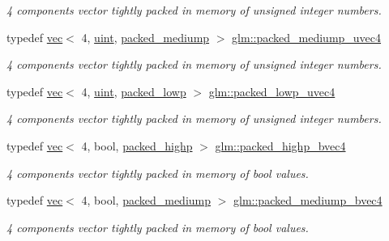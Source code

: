 \begin{DoxyCompactItemize}
\begin{DoxyCompactList}\small\item\em 4 components vector tightly packed in memory of unsigned integer numbers. \end{DoxyCompactList}\item 
typedef \mbox{\hyperlink{structglm_1_1vec}{vec}}$<$ 4, \mbox{\hyperlink{group__core__precision_ga4fd29415871152bfb5abd588334147c8}{uint}}, \mbox{\hyperlink{namespaceglm_a36ed105b07c7746804d7fdc7cc90ff25a9604654c3b137cd7898689fd34b25bc0}{packed\+\_\+mediump}} $>$ \mbox{\hyperlink{group__gtc__type__aligned_ga228b9899ea277eb8655d01c754e1ee64}{glm\+::packed\+\_\+mediump\+\_\+uvec4}}
\begin{DoxyCompactList}\small\item\em 4 components vector tightly packed in memory of unsigned integer numbers. \end{DoxyCompactList}\item 
typedef \mbox{\hyperlink{structglm_1_1vec}{vec}}$<$ 4, \mbox{\hyperlink{group__core__precision_ga4fd29415871152bfb5abd588334147c8}{uint}}, \mbox{\hyperlink{namespaceglm_a36ed105b07c7746804d7fdc7cc90ff25ac36a4bd74559be2c0b65bc48e5953b8b}{packed\+\_\+lowp}} $>$ \mbox{\hyperlink{group__gtc__type__aligned_gaddae01027a0dc8e3d953a3ca68b5a0cd}{glm\+::packed\+\_\+lowp\+\_\+uvec4}}
\begin{DoxyCompactList}\small\item\em 4 components vector tightly packed in memory of unsigned integer numbers. \end{DoxyCompactList}\item 
typedef \mbox{\hyperlink{structglm_1_1vec}{vec}}$<$ 4, bool, \mbox{\hyperlink{namespaceglm_a36ed105b07c7746804d7fdc7cc90ff25a8e8791ee77fe079b1291f710d88031bf}{packed\+\_\+highp}} $>$ \mbox{\hyperlink{group__gtc__type__aligned_gaa7a006e26052e668a16bf3b8bd81cbef}{glm\+::packed\+\_\+highp\+\_\+bvec4}}
\begin{DoxyCompactList}\small\item\em 4 components vector tightly packed in memory of bool values. \end{DoxyCompactList}\item 
typedef \mbox{\hyperlink{structglm_1_1vec}{vec}}$<$ 4, bool, \mbox{\hyperlink{namespaceglm_a36ed105b07c7746804d7fdc7cc90ff25a9604654c3b137cd7898689fd34b25bc0}{packed\+\_\+mediump}} $>$ \mbox{\hyperlink{group__gtc__type__aligned_gad50db2a2ae76ec64785b9d87cd2dfb2c}{glm\+::packed\+\_\+mediump\+\_\+bvec4}}
\begin{DoxyCompactList}\small\item\em 4 components vector tightly packed in memory of bool values. \end{DoxyCompactList}\item 

\end{DoxyCompactItemize}
